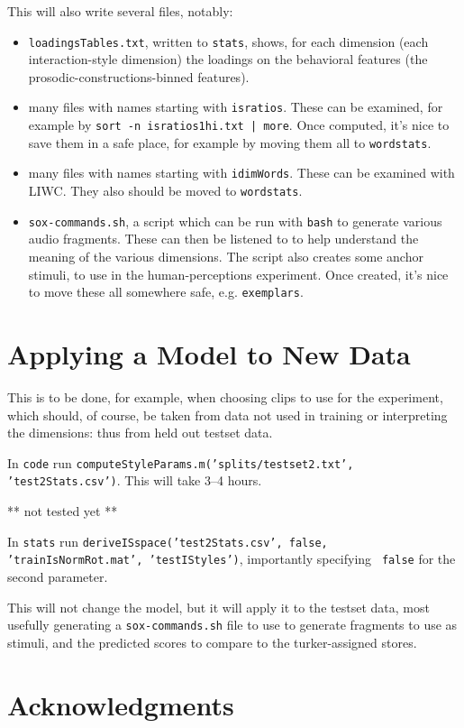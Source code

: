 \documentclass[11pt]{article}
\begin{document}
This will also write several files, notably:

\begin{itemize}   \setlength{\itemsep}{0pt}\setlength{\parskip}{0pt}
\item {\tt loadingsTables.txt}, written to {\tt stats}, shows, for each
  dimension (each interaction-style dimension) the loadings on the
  behavioral features (the prosodic-constructions-binned features).
\item many files with names starting with {\tt isratios}.  These can
  be examined, for example by {\tt sort -n isratios1hi.txt | more}.
  Once computed, it's nice to save them in a safe place, for example
  by moving them all to {\tt wordstats}. 
\item many files with names starting with {\tt idimWords}.  These can
  be examined with LIWC.  They also should be moved to {\tt wordstats}.
\item {\tt sox-commands.sh}, a script which can be run with {\tt bash}
  to generate various audio fragments.  These can then be listened to
  to help understand the meaning of the various dimensions.  The
  script also creates some anchor stimuli, to use in the
  human-perceptions experiment.  Once created, it's nice to move these
  all somewhere safe, e.g. {\tt exemplars}.
\end{itemize}

\section{Applying a Model to New Data}

This is to be done, for example, when choosing clips to use for the
experiment, which should, of course, be taken from data not used in
training or interpreting the dimensions: thus from held out testset
data.

In {\tt code} run {\tt computeStyleParams.m('splits/testset2.txt',
  'test2Stats.csv')}.  This will take  3--4 hours.

** not tested yet **

In {\tt stats} run {\tt deriveISspace('test2Stats.csv', false,
  'trainIsNormRot.mat', 'testIStyles')}, importantly specifying {\tt
  false} for the second parameter.

This will not change the model, but it will apply it to the testset
data, most usefully generating a {\tt sox-commands.sh} file to use to
generate fragments to use as stimuli, and the predicted scores to
compare to the turker-assigned stores. 


\section{Acknowledgments }  



%

\end{document}
